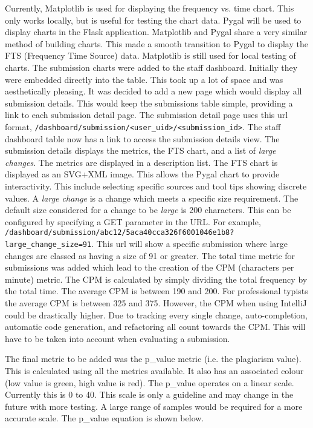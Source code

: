 Currently, Matplotlib is used for displaying the frequency vs. time chart. This only works locally, but is useful for testing the chart data. Pygal will be used to display charts in the Flask application\cite{PygalFlask}. Matplotlib and Pygal share a very similar method of building charts. This made a smooth transition to Pygal to display the FTS (Frequency Time Source) data. Matplotlib is still used for local testing of charts. The submission charts were added to the staff dashboard. Initially they were embedded directly into the table. This took up a lot of space and was aesthetically pleasing. It was decided to add a new page which would display all submission details. This would keep the submissions table simple, providing a link to each submission detail page. The submission detail page uses this url format, \texttt{/dashboard/submission/<user\_uid>/<submission\_id>}. The staff dashboard table now has a link to access the submission details view. The submission details displays the metrics, the FTS chart, and a list of \textit{large changes}. The metrics are displayed in a description list. The FTS chart is displayed as an SVG+XML image. This allows the Pygal chart to provide interactivity. This include selecting specific sources and tool tips showing discrete values. A \textit{large change} is a change which meets a specific size requirement. The default size considered for a change to be \textit{large} is 200 characters. This can be configured by specifying a GET parameter in the URL. For example, \texttt{/dashboard/submission/abc12/5aca40cca326f6001046e1b8?large\_change\_size=91}. This url will show a specific submission where large changes are classed as having a size of 91 or greater. The total time metric for submissions was added which lead to the creation of the CPM (characters per minute) metric. The CPM is calculated by simply dividing the total frequency by the total time. The average CPM is between 190 and 200\cite{LiveChatTypingSpeedTest}. For professional typists the average CPM is between 325 and 375. However, the CPM when using IntelliJ could be drastically higher. Due to tracking every single change, auto-completion, automatic code generation, and refactoring all count towards the CPM. This will have to be taken into account when evaluating a submission.

The final metric to be added was the p\_value metric (i.e. the plagiarism value). This is calculated using all the metrics available. It also has an associated colour (low value is green, high value is red). The p\_value operates on a linear scale. Currently this is 0 to 40. This scale is only a guideline and may change in the future with more testing. A large range of samples would be required for a more accurate scale. The p\_value equation is shown below.

